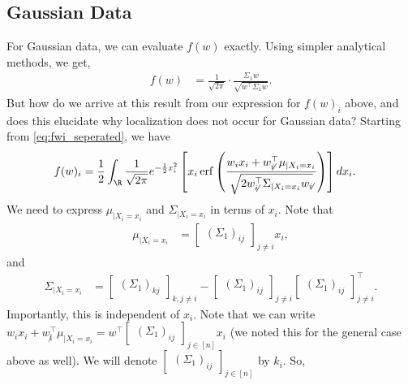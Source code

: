 \documentclass{article}
\begin{document}
\subsection{Gaussian Data}
For Gaussian data, we can evaluate $f(w)$ exactly.
Using simpler analytical methods, we get,
\begin{align}
  f(w) &= \frac{1}{\sqrt{2\pi}} \cdot \frac{ \Sigma_1 w }{ \sqrt{w^\top \Sigma_1 w} }. \label{eq:f_gaussian}
\end{align}
But how do we arrive at this result from our expression for $f(w)_i$ above, and does this elucidate why localization does not occur for Gaussian data?
Starting from \cref{eq:fwi_seperated}, we have
\begin{align*}
  f(w)_i &= \frac{1}{2} \int_{\R} \frac{1}{\sqrt{2\pi}} e^{-\frac{1}{2} x_i^2} \left[ x_i \operatorname{erf}\left( \frac{ w_i x_i + w_{\not i}^\top \mu_{\mid X_i=x_i} }{ \sqrt{ 2 w_{\not i}^\top \Sigma_{\mid X_i=x_i} w_{\not i} } } \right) \right] dx_i.
\end{align*}
We need to express $\mu_{\mid X_i=x_i}$ and $\Sigma_{\mid X_i=x_i}$ in terms of $x_i$.
Note that
\begin{align*}
  \mu_{\mid X_i=x_i}
  &= \begin{bmatrix} (\Sigma_1)_{ij} \end{bmatrix}_{j \neq i} x_i,
\end{align*}
and
\begin{align*}
  \Sigma_{\mid X_i=x_i}
  &= \begin{bmatrix} (\Sigma_1)_{kj} \end{bmatrix}_{k,j \neq i} - \begin{bmatrix} (\Sigma_1)_{ij} \end{bmatrix}_{j \neq i} \begin{bmatrix} (\Sigma_1)_{ij} \end{bmatrix}_{j \neq i}^\top.
\end{align*}
Importantly, this is independent of $x_i$.
Note that we can write $w_i x_i + w_{\not i}^\top \mu_{\mid X_i=x_i} = w^\top \begin{bmatrix} (\Sigma_1)_{ij} \end{bmatrix}_{j\in[n]} x_i$ (we noted this for the general case above as well).
We will denote $\begin{bmatrix} (\Sigma_1)_{ij} \end{bmatrix}_{j\in[n]}$ by $k_i$.
So,
\end{document}
